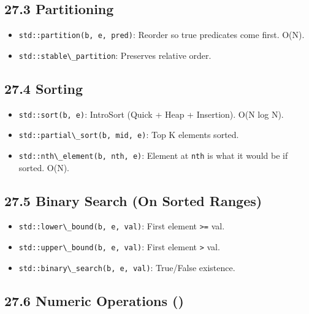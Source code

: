 \hypertarget{partitioning}{%
\subsection{27.3 Partitioning}\label{partitioning}}

\begin{itemize}
\tightlist
\item
  \passthrough{\lstinline!std::partition(b, e, pred)!}: Reorder so true
  predicates come first. O(N).
\item
  \passthrough{\lstinline!std::stable\_partition!}: Preserves relative
  order.
\end{itemize}

\hypertarget{sorting}{%
\subsection{27.4 Sorting}\label{sorting}}

\begin{itemize}
\tightlist
\item
  \passthrough{\lstinline!std::sort(b, e)!}: IntroSort (Quick + Heap +
  Insertion). O(N log N).
\item
  \passthrough{\lstinline!std::partial\_sort(b, mid, e)!}: Top K
  elements sorted.
\item
  \passthrough{\lstinline!std::nth\_element(b, nth, e)!}: Element at
  \passthrough{\lstinline!nth!} is what it would be if sorted. O(N).
\end{itemize}

\hypertarget{binary-search-on-sorted-ranges}{%
\subsection{27.5 Binary Search (On Sorted
Ranges)}\label{binary-search-on-sorted-ranges}}

\begin{itemize}
\tightlist
\item
  \passthrough{\lstinline!std::lower\_bound(b, e, val)!}: First element
  \passthrough{\lstinline!>=!} val.
\item
  \passthrough{\lstinline!std::upper\_bound(b, e, val)!}: First element
  \passthrough{\lstinline!>!} val.
\item
  \passthrough{\lstinline!std::binary\_search(b, e, val)!}: True/False
  existence.
\end{itemize}

\hypertarget{numeric-operations}{%
\subsection{27.6 Numeric Operations ()}\label{numeric-operations}}

